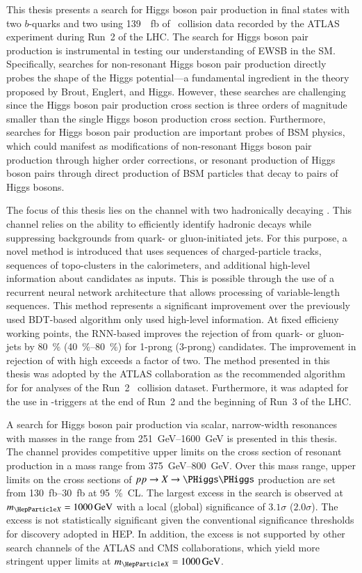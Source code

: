 This thesis presents a search for Higgs boson pair production in final states
with two $b$-quarks and two \tauleptons using \SI{139}{\per\femto\barn} of
\pp~collision data recorded by the ATLAS experiment during Run~2 of the LHC. The
search for Higgs boson pair production is instrumental in testing our
understanding of EWSB in the SM. Specifically, searches for non-resonant Higgs
boson pair production directly probes the shape of the Higgs potential---a
fundamental ingredient in the theory proposed by Brout, Englert, and
Higgs. However, these searches are challenging since the Higgs boson pair
production cross section is three orders of magnitude smaller than the single
Higgs boson production cross section. Furthermore, searches for Higgs boson pair
production are important probes of BSM physics, which could manifest as
modifications of non-resonant Higgs boson pair production through higher order
corrections, or resonant production of Higgs boson pairs through direct
production of BSM particles that decay to pairs of Higgs bosons.

The focus of this thesis lies on the channel with two hadronically decaying
\tauleptons. This channel relies on the ability to efficiently identify hadronic
\taulepton decays while suppressing backgrounds from quark- or gluon-initiated
jets. For this purpose, a novel \tauid method is introduced that uses sequences
of charged-particle tracks, sequences of topo-clusters in the calorimeters, and
additional high-level information about \tauhadvis candidates as inputs. This is
possible through the use of a recurrent neural network architecture that allows
processing of variable-length sequences. This method represents a significant
improvement over the previously used BDT-based algorithm only used high-level
information. At fixed \tauhadvis efficieny working points, the RNN-based \tauid
improves the rejection of \faketauhadvis from quark- or gluon-jets by
\SI{80}{\percent} (\SIrange{40}{80}{\percent}) for 1-prong (3-prong) \tauhadvis
candidates. The improvement in rejection of \faketauhadvis with high \pT exceeds
a factor of two. The method presented in this thesis was adopted by the ATLAS
collaboration as the recommended algorithm for \tauid for analyses of the Run~2
\pp~collision dataset. Furthermore, it was adapted for the use in
\tauhadvis-triggers at the end of Run~2 and the beginning of Run~3 of the LHC.

A search for Higgs boson pair production via scalar, narrow-width resonances
with masses in the range from \SIrange{251}{1600}{\GeV} is presented in this
thesis. The \bbtautau channel provides competitive upper limits on the cross
section of resonant \HH production in a mass range from
\SIrange{375}{800}{\GeV}. Over this mass range, upper limits on the cross
sections of $pp \to X \to \HH$ production are set from
\SIrange{130}{30}{\femto\barn} at \SI{95}{\percent}~CL. The largest excess in
the search is observed at $\mX = \SI{1000}{\GeV}$ with a local (global)
significance of $3.1\sigma$ ($2.0\sigma$). The excess is not statistically
significant given the conventional significance thresholds for discovery adopted
in HEP. In addition, the excess is not supported by other search channels of the
ATLAS and CMS collaborations, which yield more stringent upper limits at
$\mX = \SI{1000}{\GeV}$.

